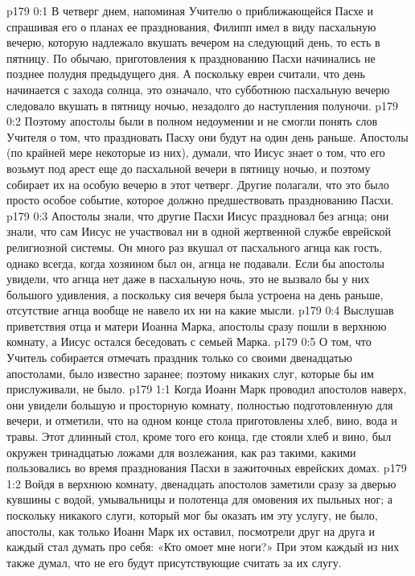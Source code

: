 \author{Комиссия срединников}
\vs p179 0:1 В четверг днем, напоминая Учителю о приближающейся Пасхе и спрашивая его о планах ее празднования, Филипп имел в виду пасхальную вечерю, которую надлежало вкушать вечером на следующий день, то есть в пятницу. По обычаю, приготовления к празднованию Пасхи начинались не позднее полудня предыдущего дня. А поскольку евреи считали, что день начинается с захода солнца, это означало, что субботнюю пасхальную вечерю следовало вкушать в пятницу ночью, незадолго до наступления полуночи.
\vs p179 0:2 Поэтому апостолы были в полном недоумении и не смогли понять слов Учителя о том, что праздновать Пасху они будут на один день раньше. Апостолы (по крайней мере некоторые из них), думали, что Иисус знает о том, что его возьмут под арест еще до пасхальной вечери в пятницу ночью, и поэтому собирает их на особую вечерю в этот четверг. Другие полагали, что это было просто особое событие, которое должно предшествовать празднованию Пасхи.
\vs p179 0:3 Апостолы знали, что другие Пасхи Иисус праздновал без агнца; они знали, что сам Иисус не участвовал ни в одной жертвенной службе еврейской религиозной системы. Он много раз вкушал от пасхального агнца как гость, однако всегда, когда хозяином был он, агнца не подавали. Если бы апостолы увидели, что агнца нет даже в пасхальную ночь, это не вызвало бы у них большого удивления, а поскольку сия вечеря была устроена на день раньше, отсутствие агнца вообще не навело их ни на какие мысли.
\vs p179 0:4 Выслушав приветствия отца и матери Иоанна Марка, апостолы сразу пошли в верхнюю комнату, а Иисус остался беседовать с семьей Марка.
\vs p179 0:5 О том, что Учитель собирается отмечать праздник только со своими двенадцатью апостолами, было известно заранее; поэтому никаких слуг, которые бы им прислуживали, не было.
\vs p179 1:1 Когда Иоанн Марк проводил апостолов наверх, они увидели большую и просторную комнату, полностью подготовленную для вечери, и отметили, что на одном конце стола приготовлены хлеб, вино, вода и травы. Этот длинный стол, кроме того его конца, где стояли хлеб и вино, был окружен тринадцатью ложами для возлежания, как раз такими, какими пользовались во время празднования Пасхи в зажиточных еврейских домах.
\vs p179 1:2 Войдя в верхнюю комнату, двенадцать апостолов заметили сразу за дверью кувшины с водой, умывальницы и полотенца для омовения их пыльных ног; а поскольку никакого слуги, который мог бы оказать им эту услугу, не было, апостолы, как только Иоанн Марк их оставил, посмотрели друг на друга и каждый стал думать про себя: «Кто омоет мне ноги?» При этом каждый из них также думал, что не его будут присутствующие считать за их слугу.
